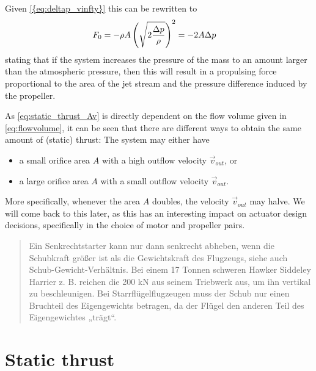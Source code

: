 Given \cref{{eq:deltap_vinfty}} this can be rewritten to
%
\begin{align}
F_{0} 
                 &= -\rho A \left(\sqrt{2\frac{\Delta p}{\rho}}\right)^2 
			  	  = -2A \Delta p
\end{align}
%
stating that if the system increases the pressure of the mass to an amount
larger than the atmospheric pressure, then this will result in a propulsing
force proportional to the area of the jet stream and the pressure difference
induced by the propeller.

As \cref{eq:static_thrust_Av} is directly dependent on
the flow volume given in \cref{eq:flowvolume}, it can be seen that there are
different ways to obtain the same amount of (static) thrust: The system may either have

\begin{itemize}
	\item a small orifice area $A$ with a high outflow velocity $\vec{v}_{out}$, or
	\item a large orifice area $A$ with a small outflow velocity $\vec{v}_{out}$.
\end{itemize}

More specifically, whenever the area $A$ doubles, the velocity $\vec{v}_{out}$ may halve. 
We will come back to this later, as this has an interesting impact on actuator design decisions, specifically in the choice of motor and propeller pairs.




\begin{quote}
Ein Senkrechtstarter kann nur dann senkrecht abheben, wenn die Schubkraft größer ist als die Gewichtskraft des Flugzeugs, siehe auch Schub-Gewicht-Verhältnis. Bei einem 17 Tonnen schweren Hawker Siddeley Harrier z. B. reichen die 200 kN aus seinem Triebwerk aus, um ihn vertikal zu beschleunigen. Bei Starrflügelflugzeugen muss der Schub nur einen Bruchteil des Eigengewichts betragen, da der Flügel den anderen Teil des Eigengewichtes „trägt“.
\end{quote}


\section{Static thrust}

